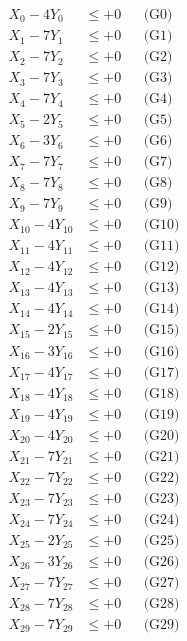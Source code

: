 \documentclass[a4paper,10pt]{article}
\begin{document}
\allowdisplaybreaks
{\small
\begin{align}
X_{0} - 4Y_{0} &\leq +0 && \text{(G0)} \\
X_{1} - 7Y_{1} &\leq +0 && \text{(G1)} \\
X_{2} - 7Y_{2} &\leq +0 && \text{(G2)} \\
X_{3} - 7Y_{3} &\leq +0 && \text{(G3)} \\
X_{4} - 7Y_{4} &\leq +0 && \text{(G4)} \\
X_{5} - 2Y_{5} &\leq +0 && \text{(G5)} \\
X_{6} - 3Y_{6} &\leq +0 && \text{(G6)} \\
X_{7} - 7Y_{7} &\leq +0 && \text{(G7)} \\
X_{8} - 7Y_{8} &\leq +0 && \text{(G8)} \\
X_{9} - 7Y_{9} &\leq +0 && \text{(G9)} \\
\allowbreak
X_{10} - 4Y_{10} &\leq +0 && \text{(G10)} \\
X_{11} - 4Y_{11} &\leq +0 && \text{(G11)} \\
X_{12} - 4Y_{12} &\leq +0 && \text{(G12)} \\
X_{13} - 4Y_{13} &\leq +0 && \text{(G13)} \\
X_{14} - 4Y_{14} &\leq +0 && \text{(G14)} \\
X_{15} - 2Y_{15} &\leq +0 && \text{(G15)} \\
X_{16} - 3Y_{16} &\leq +0 && \text{(G16)} \\
X_{17} - 4Y_{17} &\leq +0 && \text{(G17)} \\
X_{18} - 4Y_{18} &\leq +0 && \text{(G18)} \\
X_{19} - 4Y_{19} &\leq +0 && \text{(G19)} \\
\allowbreak
X_{20} - 4Y_{20} &\leq +0 && \text{(G20)} \\
X_{21} - 7Y_{21} &\leq +0 && \text{(G21)} \\
X_{22} - 7Y_{22} &\leq +0 && \text{(G22)} \\
X_{23} - 7Y_{23} &\leq +0 && \text{(G23)} \\
X_{24} - 7Y_{24} &\leq +0 && \text{(G24)} \\
X_{25} - 2Y_{25} &\leq +0 && \text{(G25)} \\
X_{26} - 3Y_{26} &\leq +0 && \text{(G26)} \\
X_{27} - 7Y_{27} &\leq +0 && \text{(G27)} \\
X_{28} - 7Y_{28} &\leq +0 && \text{(G28)} \\
X_{29} - 7Y_{29} &\leq +0 && \text{(G29)} \\

\end{align}}
\end{document}
